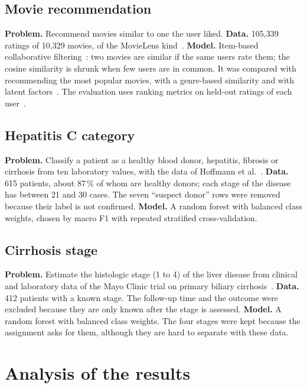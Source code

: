 \documentclass[11pt,letterpaper]{article}
\begin{document}
\subsection{Movie recommendation}

\textbf{Problem.} Recommend movies similar to one the user liked. \textbf{Data.} 105,339 ratings of 10,329 movies, of the MovieLens kind~\cite{harper2015}. \textbf{Model.} Item-based collaborative filtering~\cite{sarwar2001}: two movies are similar if the same users rate them; the cosine similarity is shrunk when few users are in common. It was compared with recommending the most popular movies, with a genre-based similarity and with latent factors~\cite{koren2009}. The evaluation uses ranking metrics on held-out ratings of each user~\cite{cremonesi2010}.

\subsection{Hepatitis C category}

\textbf{Problem.} Classify a patient as a healthy blood donor, hepatitis, fibrosis or cirrhosis from ten laboratory values, with the data of Hoffmann et al.~\cite{hoffmann2018}. \textbf{Data.} 615 patients, about 87\,\% of whom are healthy donors; each stage of the disease has between 21 and 30 cases. The seven ``suspect donor'' rows were removed because their label is not confirmed. \textbf{Model.} A random forest with balanced class weights, chosen by macro F1 with repeated stratified cross-validation.

\subsection{Cirrhosis stage}

\textbf{Problem.} Estimate the histologic stage (1 to 4) of the liver disease from clinical and laboratory data of the Mayo Clinic trial on primary biliary cirrhosis~\cite{fleming1991,dickson1989}. \textbf{Data.} 412 patients with a known stage. The follow-up time and the outcome were excluded because they are only known after the stage is assessed. \textbf{Model.} A random forest with balanced class weights. The four stages were kept because the assignment asks for them, although they are hard to separate with these data.

\section{Analysis of the results}
\end{document}
